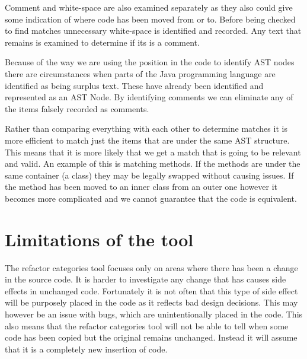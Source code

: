 Comment and white-space are also examined separately as they also could give some indication of where code has been moved from or to.
Before being checked to find matches unnecessary white-space is identified and recorded.
Any text that remains is examined to determine if its is a comment. 

Because of the way we are using the position in the code to identify AST nodes there are circumstances when parts of the Java programming language are identified as being surplus text. These have already been identified and represented as an AST Node. By identifying comments we can eliminate any of the items falsely recorded as comments.


% 
% 

Rather than comparing everything with each other to determine matches it is more efficient to match just the items that are under the same AST structure.  This means that it is more likely that we get a match that is going to be relevant and valid.  An example of this is matching methods. If the methods are under the same container (a class) they may be legally swapped without causing issues.  If the method has been moved to an inner class from an outer one however it becomes more complicated and we cannot guarantee that the code is equivalent.  


\section{Limitations of the tool}
The refactor categories tool focuses only on areas where there has been a change in the source code. 
It is harder to investigate any change that has causes side effects in unchanged code.  Fortunately it is not often that this type of side effect will be purposely placed in the code as it reflects bad design decisions.  This may however be an issue with bugs, which are unintentionally placed in the code.  
This also means that the refactor categories tool will not be able to tell when some code has been copied but the original remains unchanged. Instead it will assume that it is a completely new insertion of code.

